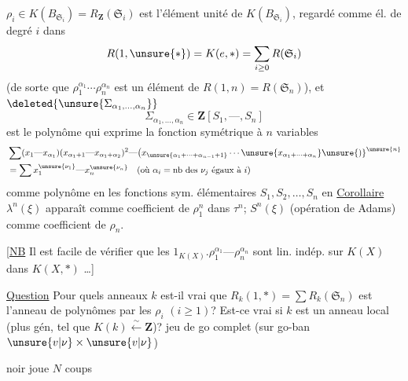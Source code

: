 $\rho_i\in K(B_{\mathfrak S_i})=R_{\mathbf Z}(\mathfrak S_i)$ est l'élément
unité de $K(B_{\mathfrak S_i})$, regardé comme él. de
degré $i$ dans
\[
R(1,\unsure{*})=K(e,*)=\sum_{i\geq0}R(\mathfrak S_i)
\]
(de sorte que $\rho_1^{\alpha_1}\cdots\rho_n^{\alpha_n}$ est un élément de
$R(1,n)=R(\mathfrak S_n)$), et $\deleted{\unsure{\Sigma_{\alpha_1,\ldots,\alpha_n}}}$
\[
\Sigma_{\alpha_1,\ldots,\alpha_n}\in\mathbf Z[S_1,\text{---},S_n]
\]
est le polynôme  qui exprime la fonction
symétrique à $n$ variables
\[
\begin{aligned}
&\sum(x_1\text{---}x_{\alpha_1})(x_{\alpha_1+1}\text{---}x_{\alpha_1+\alpha_2})^2\text{---}
\bigl(x_{\unsure{\alpha_1+\cdots+\alpha_{n-1}+1}}\cdots\unsure{x_{\alpha_1+\cdots+\alpha_n}}\unsure{)}^{\unsure{n}}\\
&=\sum x_1^{\unsure{\nu_1}}\text{---}x_n^{\unsure{\nu_n}}\quad(\text{où }\alpha_i=\text{nb des }\nu_j\text{ égaux à }i)
\end{aligned}
\]
comme polynôme en les fonctions sym.
élémentaires $S_1,S_2,\ldots,S_n$ en
\uline{Corollaire}  $\lambda^n(\xi)$ apparaît comme
coefficient de $\rho_1^n$ dans $\tau^n$; $S^n(\xi)$ (opération
de Adams) comme coefficient de $\rho_n$.

[\uline{NB} Il est facile  de vérifier que
les $1_{K(X)}.\rho_1^{\alpha_1}\text{---}\rho_n^{\alpha_n}$ sont lin. indép. sur $K(X)$
dans $K(X,*)$ \ldots]

\uline{Question} Pour quels anneaux $k$ est-il
vrai que $R_k(1,*)=\sum R_k(\mathfrak S_n)$ est
l'anneau de polynômes   par
les $\rho_i$ $(i\geq1)$? Est-ce vrai
si $k$ est un anneau local (plus
gén, tel que $K(k)\xleftarrow{\sim}\mathbf Z$)?
jeu de go complet (sur go-ban $\unsure{v|\nu}\times\unsure{v|\nu}$)

noir joue $N$ coups

